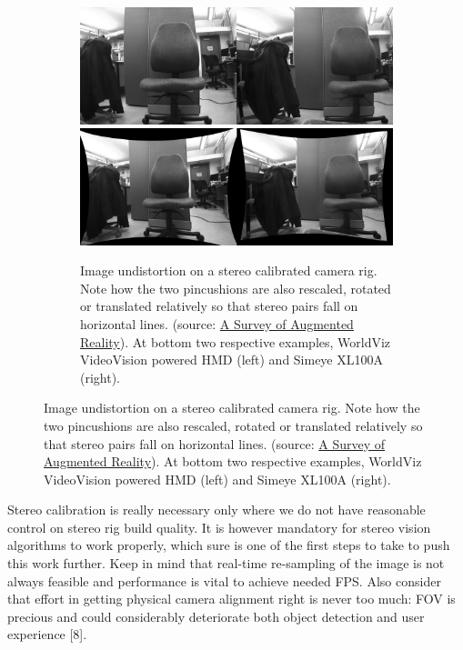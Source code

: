 \begin{figure}
\begin{subfigure}
\centering
\includegraphics[width=\linewidth]{pictures/stereo-distorted}
\includegraphics[width=\linewidth]{pictures/stereo-undistorted}
\caption{Image undistortion on a stereo calibrated camera rig. Note how the two pincushions are also rescaled, rotated or translated relatively so that stereo pairs fall on horizontal lines. (source: \href{http://www.cs.unc.edu/~azuma/ARpresence.pdf}{A Survey of Augmented Reality}). At bottom two respective examples, WorldViz VideoVision powered HMD (left) and Simeye XL100A (right).}
\label{fig:stereo_undistort}
\end{subfigure}

\end{figure}

Stereo calibration is really necessary only where we do not have reasonable control on stereo rig build quality. It is however mandatory for stereo vision algorithms to work properly, which sure is one of the first steps to take to push this work further. Keep in mind that real-time re-sampling of the image is not always feasible and performance is vital to achieve needed FPS. Also consider that effort in getting physical camera alignment right is never too much: FOV is precious and could considerably deteriorate both object detection and user experience [8].

